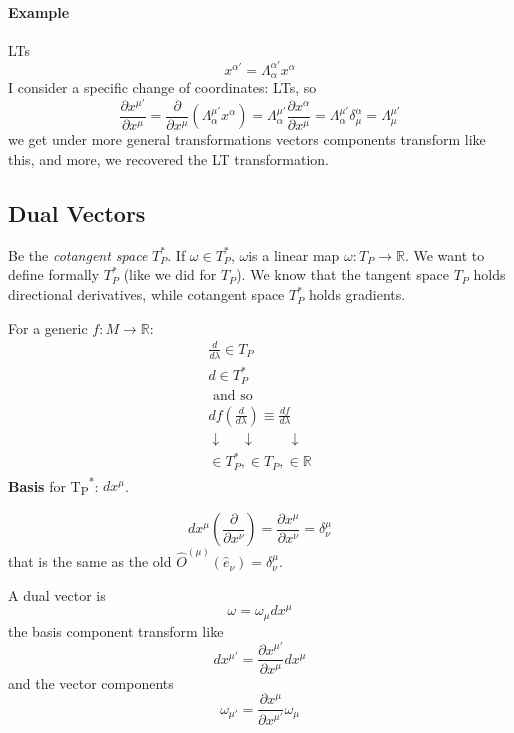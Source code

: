 \paragraph{Example} LTs
\[
x^{\alpha '} = \Lambda^{\alpha '}_{\alpha }x^{\alpha }
\]
I consider a specific change of coordinates: LTs, so
\[
\frac{\partial x^{\mu '}}{\partial x^{\mu }} = \frac{\partial}{\partial x^{\mu }} \left( \Lambda^{\mu '}_{\alpha }x^{\alpha } \right) = \Lambda^{\mu '}_{\alpha } \frac{\partial x^{\alpha }}{\partial x^{\mu }} = \Lambda^{\mu '}_{\alpha } \delta^{\alpha }_{\mu } = \Lambda^{\mu '}_{\mu }
\]
we get under more general transformations vectors components transform like this, and more, we recovered the LT transformation.

\subsection{Dual Vectors}
Be the \emph{cotangent space} $T_{P}^{*}$. If $\omega \in T_{P}^{*}$, $\omega $is a linear map $\omega : T_{P}\to \mathbb{R}$.
We want to define formally $T_{P}^{*}$ (like we did for $T_{P}$).
We know that the tangent space $T_{P}$ holds directional derivatives, while cotangent space $T_{P}^{*}$ holds gradients. \par
For a generic $f: M\to \mathbb{R}$:
\begin{gather*}
\frac{d}{d\lambda } \in T_{P} \\
d \in T_{P}^{*} \\
\text{ and so } \\
df \left( \frac{d}{d\lambda } \right) \equiv \frac{df}{d\lambda }\\
\downarrow \quad\; \downarrow \qquad \;\downarrow \\
\in T_{P}^{*}, \in T_{P}, \in \mathbb{R}
\end{gather*}
\textbf{Basis} for T\textsubscript{P}\textsuperscript{*}: $dx^{\mu }$.\par
\[
dx^{\mu } \left( \frac{\partial}{\partial x^{\nu }} \right) = \frac{\partial x^{\mu }}{\partial x^{\nu }} = \delta^{\mu }_{\nu }
\]
that is the same as the old $\hat{O}^{\left( \mu  \right)}\left( \hat{e}_{\nu } \right)=\delta^{\mu }_{\nu }$.

A dual vector is \[
\omega = \omega_{\mu }dx^{\mu }
\]
the basis component transform like
\[
dx^{\mu '} = \frac{\partial x^{\mu '}}{\partial x^{\mu }} dx^{\mu }
\]
and the vector components
\[
\omega_{\mu '} = \frac{\partial x^{\mu }}{\partial x^{\mu '}}\omega_{\mu }
\]

